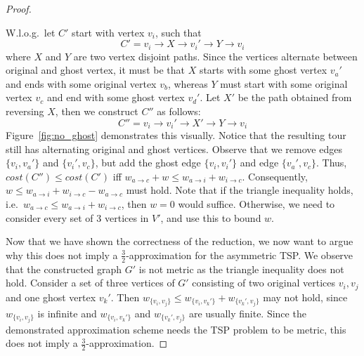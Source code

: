 \documentclass{article}
\begin{document}
\begin{proof}
\begin{itemize}
        W.l.o.g.~let $C'$ start with vertex $v_i$, such that
        \[
            C' = v_i \to X \to v_i' \to Y \to v_i
        \]
        where $X$ and $Y$ are two vertex disjoint paths. Since the vertices alternate between original and ghost vertex, it must be that $X$ starts with some ghost vertex $v_a'$ and ends with some original vertex $v_b$, whereas $Y$ must start with some original vertex $v_c$ and end with some ghost vertex $v_d'$. Let $X'$ be the path obtained from reversing $X$, then we construct $C''$ as follows:
         \[
            C'' = v_i \to v_i' \to X' \to Y \to v_i
        \]
        Figure~\ref{fig:no_ghost} demonstrates this visually. Notice that the resulting tour still has alternating original and ghost vertices. Observe that we remove edges $\{v_i, v_a'\}$ and $\{v_i', v_c\}$, but add the ghost edge $\{v_i, v_i'\}$ and edge $\{v_a', v_c\}$. Thus, $cost(C'') \le cost(C')$ iff $w_{a \to c} + w \le w_{a \to i} + w_{i \to c}$. Consequently, $w \le w_{a \to i} + w_{i \to c} - w_{a \to c}$ must hold. Note that if the triangle inequality holds, i.e.~$w_{a \to c} \le w_{a \to i} + w_{i \to c}$, then $w=0$ would suffice. Otherwise, we need to consider every set of 3 vertices in $V'$, and use this to bound $w$.
    \end{itemize}
    Now that we have shown the correctness of the reduction, we now want to argue why this does not imply a $\frac{3}{2}$-approximation for the asymmetric TSP. We observe that the constructed graph $G'$ is not metric as the triangle inequality does not hold. Consider a set of three vertices of $G'$ consisting of two original vertices $v_i, v_j$ and one ghost vertex $v_k'$. Then $w_{\{v_i, v_j\}} \le w_{\{v_i, v_k'\}} + w_{\{v_k', v_j\}}$ may not hold, since $w_{\{v_i, v_j\}}$ is infinite and $w_{\{v_i, v_k'\}}$ and $w_{\{v_k', v_j\}}$ are usually finite. Since the demonstrated approximation scheme needs the TSP problem to be metric, this does not imply a $\frac{3}{2}$-approximation.
\end{proof}
\end{document}
